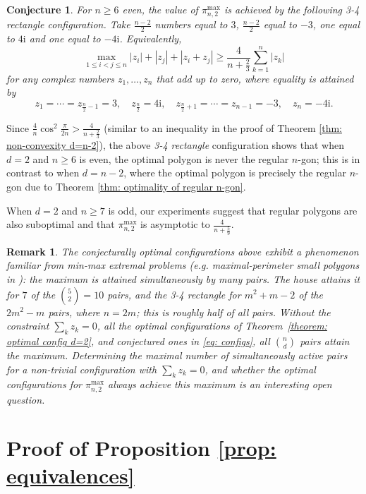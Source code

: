 \documentclass[reqno,hidelinks,11pt]{amsart}
\numberwithin{equation}{section}
\newtheorem{remark}[theorem]{Remark}
\newtheorem{conjecture}[theorem]{Conjecture}
\begin{document}
\begin{conjecture} \label{conj: n>=6 even}
    For $n \geq 6$ even, the value of $\pi_{n,2}^{\max}$ is achieved by the following \emph{3-4 rectangle} configuration. Take $\frac{n-2}2$ numbers equal to $3$, $\frac{n-2}2$ equal to $-3$, one equal to $4\mathrm{i}$ and one equal to $-4\mathrm{i}$. Equivalently,
    \[
    \max_{1\le i<j\le n}|z_i|+|z_j|+|z_i+z_j|\ge\frac{4}{n+\frac23}\sum_{k=1}^{n}|z_k|
    \]
    for any complex numbers $z_1,\dots,z_{n}$ that add up to zero, where equality is attained by 
    \[z_1 = \cdots = z_{\frac{n}2-1} = 3, \quad z_{\frac{n}2}=4\mathrm{i}, \quad z_{\frac{n}2 + 1} = \cdots = z_{n-1} = -3, \quad z_n=-4\mathrm{i}.
    \]
\end{conjecture}

Since $\frac4n\cos^2\frac{\pi}{2n}>\frac4{n+\frac23}$ (similar to an inequality in the proof of Theorem \ref{thm: non-convexity d=n-2}), the above \emph{3-4 rectangle} configuration shows that when $d=2$ and $n\ge6$ is even, the optimal polygon is never the regular $n$-gon; this is in contrast to when $d=n-2$, where the optimal polygon is precisely the regular $n$-gon due to Theorem \ref{thm: optimality of regular n-gon}. 

When $d=2$ and $n\ge7$ is odd, our experiments suggest that regular polygons are also suboptimal and that $\pi_{n,2}^{\max}$ is asymptotic to $\frac{4}{n+\frac59}$.

\begin{remark}
The conjecturally optimal configurations above exhibit a phenomenon familiar from min-max extremal problems (e.g. maximal-perimeter small polygons in
\cite{Henrion13,Bingane24}): the maximum is attained
simultaneously by many pairs. \emph{The house} attains it for $7$ of the
$\binom{5}{2}=10$ pairs, and the \emph{3-4 rectangle} for
$m^2+m-2$ of the $2m^2-m$ pairs, where $n=2m$; this is roughly
half of all pairs. Without the constraint $\sum_k z_k=0$, all the optimal configurations of
Theorem~\ref{theorem: optimal config d=2}, and conjectured ones in \eqref{eq: configs}, \emph{all} $\binom{n}{d}$ pairs
attain the maximum.
Determining the maximal number of simultaneously active
pairs for a non-trivial configuration with $\sum_k z_k = 0$, and
whether the optimal configurations for $\pi^{\max}_{n,2}$ always
achieve this maximum is an interesting open question. 
\end{remark}


\appendix

\section{Proof of Proposition \ref{prop: equivalences}}\label{sec:appendixA}
\end{document}
